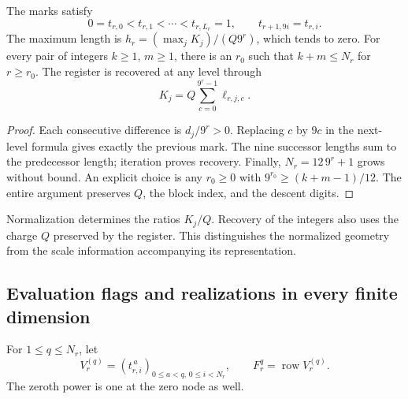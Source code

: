 \begin{proposition}
\label{prop:dim-grid}
The marks satisfy
\[
 0=t_{r,0}<t_{r,1}<\cdots<t_{r,L_r}=1,
 \qquad t_{r+1,9i}=t_{r,i}.
\]
The maximum length is \(h_r=(\max_jK_j)/(Q9^r)\), which tends
to zero. For every pair of integers \(k\geq1\), \(m\geq1\),
there is an \(r_0\) such that \(k+m\leq N_r\) for \(r\geq r_0\).
The register is recovered at any level through
\[
 K_j=Q\sum_{c=0}^{9^r-1}\ell_{r,j,c}.
\]
\end{proposition}
\begin{proof}
Each consecutive difference is \(d_j/9^r>0\). Replacing \(c\)
by \(9c\) in the next-level formula gives exactly the previous mark.
The nine successor lengths sum to the predecessor length; iteration proves
recovery. Finally, \(N_r=12\,9^r+1\) grows without bound.
An explicit choice is any \(r_0\geq0\) with
\(9^{r_0}\geq(k+m-1)/12\). The entire argument preserves \(Q\),
the block index, and the descent digits.
\end{proof}

Normalization determines the ratios \(K_j/Q\). Recovery of the
integers also uses the charge \(Q\) preserved by the register.
This distinguishes the normalized geometry from the scale information
accompanying its representation.

\subsection{Evaluation flags and realizations in every finite dimension}

For \(1\leq q\leq N_r\), let
\[
 V_r^{(q)}=(t_{r,i}^{\,a})_{0\leq a<q,\,0\leq i<N_r},
 \qquad F_r^q=\operatorname{row}V_r^{(q)}.
\]
The zeroth power is one at the zero node as well.

